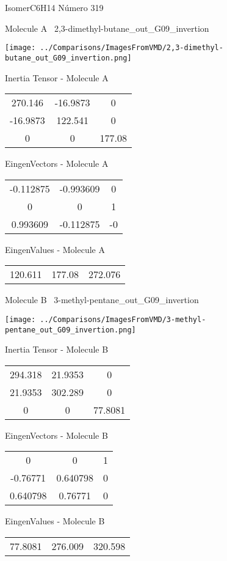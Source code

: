 \vtab[-3cm]
\begin{center}
{\large IsomerC6H14 \tab Número 319}
\end{center}
\begin{multicols}{2}
\begin{center}

Molecule A \
2,3-dimethyl-butane\_out\_G09\_invertion

\texttt{[image: ../Comparisons/ImagesFromVMD/2,3-dimethyl-butane\_out\_G09\_invertion.png]}

Inertia Tensor - Molecule A \\
\begin{tabular}{|c c c|}
270.146	 & 	-16.9873	 & 	0	 \\
-16.9873	 & 	122.541	 & 	0	 \\
0	 & 	0	 & 	177.08
\end{tabular}

\vtab
 EingenVectors - Molecule A     \\
\begin{tabular}{|c c c|}
-0.112875	 & 	-0.993609	 & 	0	 \\
0	 & 	0	 & 	1	 \\
0.993609	 & 	-0.112875	 & 	-0
\end{tabular}

\vtab
 EingenValues - Molecule A     \\
\begin{tabular}{|c c c|}
120.611	 & 	177.08	 & 	272.076	 \\
\end{tabular}
\columnbreak

Molecule B \
3-methyl-pentane\_out\_G09\_invertion

\texttt{[image: ../Comparisons/ImagesFromVMD/3-methyl-pentane\_out\_G09\_invertion.png]}

Inertia Tensor - Molecule B \\
\begin{tabular}{|c c c|}
294.318	 & 	21.9353	 & 	0	 \\
21.9353	 & 	302.289	 & 	0	 \\
0	 & 	0	 & 	77.8081
\end{tabular}

\vtab
 EingenVectors - Molecule B     \\
\begin{tabular}{|c c c|}
0	 & 	0	 & 	1	 \\
-0.76771	 & 	0.640798	 & 	0	 \\
0.640798	 & 	0.76771	 & 	0
\end{tabular}

\vtab
 EingenValues - Molecule B     \\
\begin{tabular}{|c c c|}
77.8081	 & 	276.009	 & 	320.598	 \\
\end{tabular}

\end{center}
\end{multicols}

